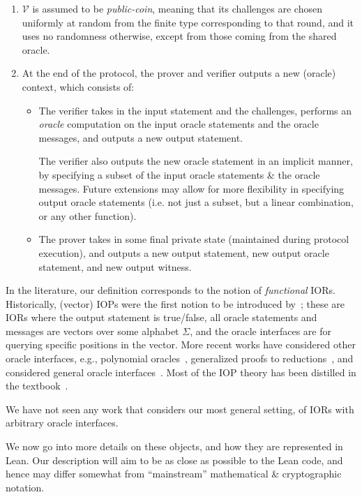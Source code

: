 \begin{enumerate}
    \item $\mathcal{V}$ is assumed to be \emph{public-coin}, meaning that its challenges are chosen
    uniformly at random from the finite type corresponding to that round, and it uses no randomness
    otherwise, except from those coming from the shared oracle.

    \item At the end of the protocol, the prover and verifier outputs a new (oracle) context, which consists of:
    \begin{itemize}
        \item The verifier takes in the input statement and the challenges, performs an \emph{oracle} computation on the input oracle statements and the oracle messages, and outputs a new output statement.

        The verifier also outputs the new oracle statement in an implicit manner, by specifying a
        subset of the input oracle statements \& the oracle messages. Future extensions may allow for more flexibility in specifying output oracle statements (i.e. not just a subset, but a linear combination, or any other function).
        \item The prover takes in some final private state (maintained during protocol execution), and outputs a new output statement, new output oracle statement, and new output witness.
    \end{itemize}
\end{enumerate}

\begin{remark}
In the literature, our definition corresponds to the notion of \emph{functional} IORs. Historically,
(vector) IOPs were the first notion to be introduced by~\cite{IOPs}; these are IORs where the output
statement is true/false, all oracle statements and messages are vectors over some alphabet $\Sigma$,
and the oracle interfaces are for querying specific positions in the vector. More recent works have
considered other oracle interfaces, e.g., polynomial oracles~\cite{Marlin, DARK}, generalized proofs
to reductions~\cite{ARoK, WARP, Arc, fics-facs}, and considered general oracle
interfaces~\cite{WHIR}. Most of the IOP theory has been distilled in the
textbook~\cite{ChiesaYogev2024}.

We have not seen any work that considers our most general setting, of IORs with arbitrary oracle interfaces.
\end{remark}

We now go into more details on these objects, and how they are represented in Lean. Our description will aim to be as close as possible to the Lean code, and hence may differ somewhat from ``mainstream'' mathematical \& cryptographic notation.

